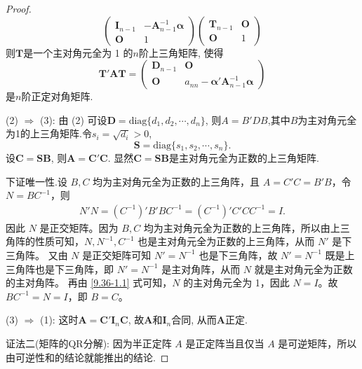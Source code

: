 \documentclass[../../main.tex]{subfiles}%
\begin{document}
\begin{proof}
\[\begin{pmatrix}
\boldsymbol{I}_{n - 1} & -\boldsymbol{A}_{n - 1}^{-1}\boldsymbol{\alpha} \\
\boldsymbol{O} & 1
\end{pmatrix}
\begin{pmatrix}
\boldsymbol{T}_{n - 1} & \boldsymbol{O} \\
\boldsymbol{O} & 1
\end{pmatrix}
\]
则$\boldsymbol{T}$是一个主对角元全为 1 的$n$阶上三角矩阵, 使得
\[
\boldsymbol{T}'\boldsymbol{A}\boldsymbol{T}=\begin{pmatrix}
\boldsymbol{D}_{n - 1} & \boldsymbol{O} \\
\boldsymbol{O} & a_{nn}-\boldsymbol{\alpha}'\boldsymbol{A}_{n - 1}^{-1}\boldsymbol{\alpha}
\end{pmatrix}
\]
是$n$阶正定对角矩阵.

(2) $\Rightarrow$ (3): 由 (2) 可设$\boldsymbol{D}=\text{diag}\{d_1, d_2, \cdots, d_n\}$, 则$A=B'DB$,其中$B$为主对角元全为1的上三角矩阵.令$s_i = \sqrt{d_i}>0$,
\[
\boldsymbol{S}=\text{diag}\{s_1, s_2, \cdots, s_n\}.
\]
设$\boldsymbol{C}=\boldsymbol{S}\boldsymbol{B}$, 则$\boldsymbol{A}=\boldsymbol{C}'\boldsymbol{C}$. 显然$\boldsymbol{C}=\boldsymbol{S}\boldsymbol{B}$是主对角元全为正数的上三角矩阵.

下证唯一性.设 \(B,C\) 均为主对角元全为正数的上三角阵，且 \(A = C'C = B'B\)，令 \(N = BC^{-1}\)，则
\begin{align}
N'N = \left( C^{-1} \right)'B'BC^{-1} = \left( C^{-1} \right)'C'CC^{-1} = I. \label{9.36-1.1}
\end{align}
因此 \(N\) 是正交矩阵。因为 \(B,C\) 均为主对角元全为正数的上三角阵，所以由上三角阵的性质可知，\(N,N^{-1},C^{-1}\) 也是主对角元全为正数的上三角阵，从而 \(N'\) 是下三角阵。
又由 \(N\) 是正交矩阵可知 \(N' = N^{-1}\) 也是下三角阵，故 \(N' = N^{-1}\) 既是上三角阵也是下三角阵，即 \(N' = N^{-1}\) 是主对角阵，从而 \(N\) 就是主对角元全为正数的主对角阵。
再由 \eqref{9.36-1.1} 式可知，\(N\) 的主对角元全为 1，因此 \(N = I\)。故 \(BC^{-1} = N = I\)，即 \(B = C\)。

(3) $\Rightarrow$ (1): 这时$\boldsymbol{A}=\boldsymbol{C}'\boldsymbol{I}_n\boldsymbol{C}$, 故$\boldsymbol{A}$和$\boldsymbol{I}_n$合同, 从而$\boldsymbol{A}$正定.

{\color{blue}证法二(矩阵的QR分解):}
因为半正定阵 $A$ 是正定阵当且仅当 $A$ 是可逆矩阵，所以由可逆性和的结论就能推出的结论.
\end{proof}
\end{document}

